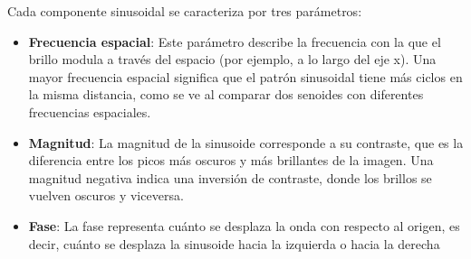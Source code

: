 Cada componente sinusoidal se caracteriza por tres parámetros:
\begin{itemize}
    \item \textbf{Frecuencia espacial}: Este parámetro describe la frecuencia con la que el brillo modula a través del espacio (por ejemplo, a lo largo del eje x). Una mayor frecuencia espacial significa que el patrón sinusoidal tiene más ciclos en la misma distancia, como se ve al comparar dos senoides con diferentes frecuencias espaciales.
    \item \textbf{Magnitud}: La magnitud de la sinusoide corresponde a su contraste, que es la diferencia entre los picos más oscuros y más brillantes de la imagen. Una magnitud negativa indica una inversión de contraste, donde los brillos se vuelven oscuros y viceversa.
    \item \textbf{Fase}: La fase representa cuánto se desplaza la onda con respecto al origen, es decir, cuánto se desplaza la sinusoide hacia la izquierda o hacia la derecha
\end{itemize}

